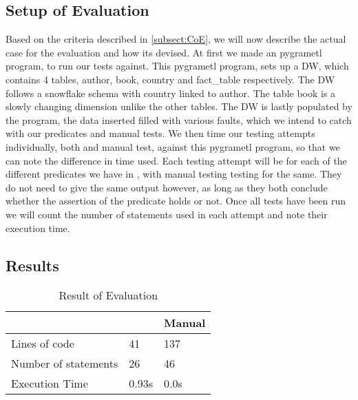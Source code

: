 \subsection{Setup of Evaluation}
Based on the criteria described in \cref{subsect:CoE}, we will now describe the actual case for the evaluation and how its devised. At first we made an pygrametl program, to run our tests against. This pygrametl program, sets up a DW, which contains 4 tables, author, book, country and fact\_table respectively. The DW follows a snowflake schema with country linked to author. The table book is a slowly changing dimension unlike the other tables.
The DW is lastly populated by the program, the data inserted filled with various faults, which we intend to catch with our predicates and manual tests.
We then time our testing attempts individually, both \FW{} and manual test, against this pygrametl program, so that we can note the difference in time used. Each testing attempt will be for each of the different predicates we have in \FW{}, with manual testing testing for the same. They do not need to give the same output however, as long as they both conclude whether the assertion of the predicate holds or not. Once all tests have been run we will count the number of statements used in each attempt and note their execution time.


\subsection{Results}

\begin{table}[h]
\centering
\caption{Result of Evaluation}
\label{table:result}
\begin{tabular}{|p{}|p{}|p{}|}
\hline
												& \FW{}	 	& Manual				  \\ \hline
Lines of code					 	& 41      & 137          		\\ \hline
Number of statements   	& 26      & 46             	\\ \hline
Execution Time         	& 0.93s   & 0.0s           	\\ \hline
\end{tabular}
\end{table}









